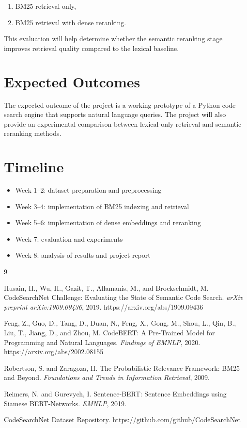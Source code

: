 \documentclass[11pt,a4paper]{article}
\begin{document}
\begin{enumerate}
    \item BM25 retrieval only,
    \item BM25 retrieval with dense reranking.
\end{enumerate}

This evaluation will help determine whether the semantic reranking stage improves retrieval quality compared to the lexical baseline.

\section{Expected Outcomes}

The expected outcome of the project is a working prototype of a Python code search engine that supports natural language queries. The project will also provide an experimental comparison between lexical-only retrieval and semantic reranking methods.

\section{Timeline}

\begin{itemize}
    \item Week 1--2: dataset preparation and preprocessing
    \item Week 3--4: implementation of BM25 indexing and retrieval
    \item Week 5--6: implementation of dense embeddings and reranking
    \item Week 7: evaluation and experiments
    \item Week 8: analysis of results and project report
\end{itemize}

\begin{thebibliography}{9}

Husain, H., Wu, H., Gazit, T., Allamanis, M., and Brockschmidt, M.  
CodeSearchNet Challenge: Evaluating the State of Semantic Code Search.  
\textit{arXiv preprint arXiv:1909.09436}, 2019.  
https://arxiv.org/abs/1909.09436

Feng, Z., Guo, D., Tang, D., Duan, N., Feng, X., Gong, M., Shou, L., Qin, B., Liu, T., Jiang, D., and Zhou, M.  
CodeBERT: A Pre-Trained Model for Programming and Natural Languages.  
\textit{Findings of EMNLP}, 2020.  
https://arxiv.org/abs/2002.08155

Robertson, S. and Zaragoza, H.  
The Probabilistic Relevance Framework: BM25 and Beyond.  
\textit{Foundations and Trends in Information Retrieval}, 2009.

Reimers, N. and Gurevych, I.  
Sentence-BERT: Sentence Embeddings using Siamese BERT-Networks.  
\textit{EMNLP}, 2019.

CodeSearchNet Dataset Repository.  
https://github.com/github/CodeSearchNet

\end{thebibliography}
\end{document}
